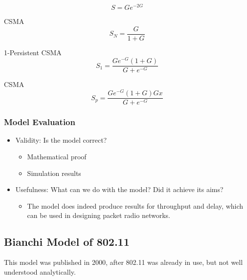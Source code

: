 \begin{equation}\label{eq:Slotted_ALOHA_Throughput}
  S = G e^{-2G}
\end{equation}

 CSMA
\begin{equation}\label{eq:Non_Persistent_CSMA_Throughput}
  S_{N} = \frac{G}{1+G}
\end{equation}

1-Persistent CSMA
\begin{equation}\label{eq:1_Persistent_CSMA_Throughput}
  S_{1} = \frac{G e^{-G} (1+G)}{G + e^{-G}}
\end{equation}

 CSMA
\begin{equation}\label{eq:p_Persistent_CSMA_Throughput}
  S_{p} = \frac{G e^{-G} (1+G) Gx}{G+e^{-G}}
\end{equation}

\subsubsection{Model Evaluation}\label{subsubsec:Kleinrock_Tobagi_Model_Eval}
\begin{itemize}[noitemsep]
\item Validity: Is the model correct?
  \begin{itemize}[noitemsep]
  \item Mathematical proof
  \item Simulation results
  \end{itemize}

\item Usefulness: What can we do with the model? Did it achieve
  its aims?
  \begin{itemize}[noitemsep]
  \item The model does indeed produce results for throughput and delay, which can be used in designing packet radio networks.
  \end{itemize}
\end{itemize}

\subsection{Bianchi Model of 802.11}\label{subsec:Bianchi_Model}
This model was published in 2000, after 802.11 was already in use, but not well understood analytically.

